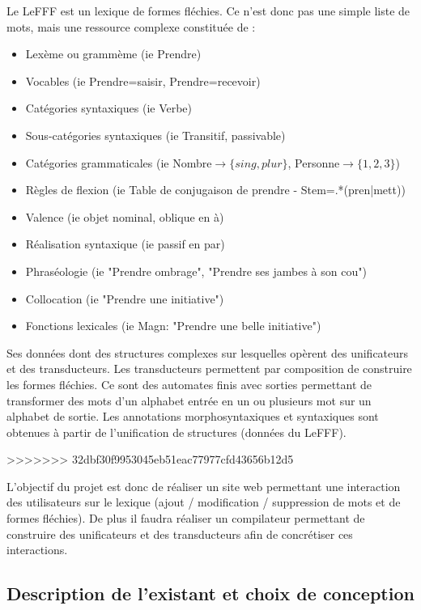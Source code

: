 \documentclass[12pt,a4paper]{article}
\begin{document}
Le LeFFF est un lexique de formes fléchies. Ce n'est donc pas une simple liste de mots, mais une ressource complexe constituée de :
\begin{itemize}  
  \item Lexème ou grammème (ie Prendre)
  \item Vocables (ie Prendre=saisir, Prendre=recevoir)
  \item Catégories syntaxiques (ie Verbe)
  \item Sous-catégories syntaxiques (ie Transitif, passivable)
  \item Catégories grammaticales (ie Nombre$\rightarrow\{sing, plur\}$, Personne$\rightarrow\{1, 2, 3\}$)
  \item Règles de flexion (ie Table de conjugaison de prendre - Stem=.*(pren|mett))
  \item Valence (ie objet nominal, oblique en à)
  \item Réalisation syntaxique (ie passif en par)
  \item Phraséologie (ie "Prendre ombrage", "Prendre ses jambes à son cou")
  \item Collocation (ie "Prendre une initiative")
  \item Fonctions lexicales (ie Magn: "Prendre une belle initiative")
\end{itemize}

\smallbreak

Ses données dont des structures complexes sur lesquelles opèrent des unificateurs et des transducteurs.
\newline Les transducteurs permettent par composition de construire les formes fléchies. 
Ce sont des automates finis avec sorties permettant de transformer des mots d'un alphabet entrée en un ou plusieurs mot sur un alphabet de sortie.
\newline Les annotations morphosyntaxiques et syntaxiques sont obtenues à partir de l'unification de structures (données du LeFFF).

\smallbreak
>>>>>>> 32dbf30f9953045eb51eac77977cfd43656b12d5

L'objectif du projet est donc de réaliser un site web permettant une interaction des utilisateurs sur le lexique (ajout / modification / suppression de mots et de formes fléchies). 
De plus il faudra réaliser un compilateur permettant de construire des unificateurs et des transducteurs afin de concrétiser ces interactions.

\subsection{Description de l'existant et choix de conception}
\end{document}
